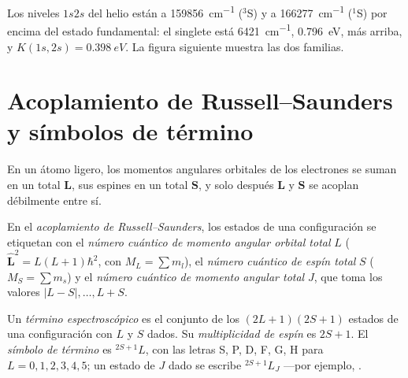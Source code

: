 \begin{example}\label{ex:b3:many-electron-atoms:K}
Los niveles $1s2s$ del helio están a \qty{159856}{cm^{-1}} (${}^3$S) y a
\qty{166277}{cm^{-1}} (${}^1$S) por encima del estado fundamental: el singlete está
\qty{6421}{cm^{-1}}, \qty{0.796}{eV}, más arriba, y $K(1s,2s) = \qty{0.398}{eV}$.
La figura siguiente muestra las dos familias.
\end{example}

\section{Acoplamiento de Russell--Saunders y símbolos de término}

En un átomo ligero, los momentos angulares orbitales de los electrones se suman en un
total $\mathbf L$, sus espines en un total $\mathbf S$, y solo después
$\mathbf L$ y $\mathbf S$ se acoplan débilmente entre sí.

\begin{definition}\label{def:b3:many-electron-atoms:russell-saunders}
En el \emph{acoplamiento de Russell--Saunders}, los
estados de una configuración se etiquetan con el \emph{número cuántico de momento angular
orbital total}
$L$ ($\hat{\mathbf L}^2 = L(L+1)\hbar^2$, con $M_L = \sum m_l$), el \emph{número
cuántico de espín total} $S$ ($M_S = \sum m_s$)
y el \emph{número cuántico de momento angular total}
$J$, que toma los valores $|L - S|, \dots, L + S$.
\end{definition}

\begin{definition}\label{def:b3:many-electron-atoms:term}
Un \emph{término espectroscópico} es el conjunto de los
$(2L+1)(2S+1)$ estados de una configuración con $L$ y $S$ dados. Su
\emph{multiplicidad de espín} es $2S + 1$. El \emph{símbolo de término}
 es ${}^{2S+1}L$, con las letras S, P, D, F, G, H
para $L = 0, 1, 2, 3, 4, 5$; un estado de $J$ dado se escribe ${}^{2S+1}L_J$
---por ejemplo, .
\end{definition}

